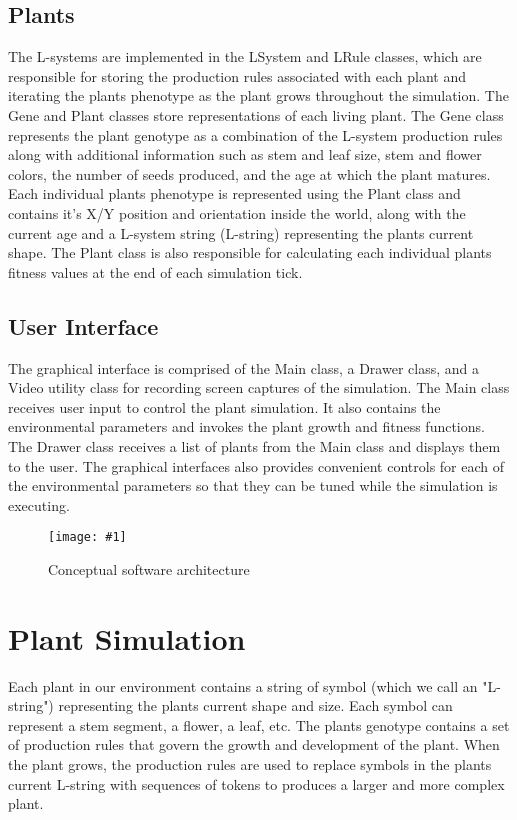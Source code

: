 \documentclass[conference]{acmsiggraph}
\newcommand{\onecol}[3]{
  \begin{figure}
    \centering
    \texttt{[image: \#1]}
    \vspace{0.0in}%
    \caption{#3}
    \label{#2}
  \end{figure}
}
\begin{document}
\subsection{Plants}

The L-systems are implemented in the LSystem and LRule classes, which are
responsible for storing the production rules associated with each plant and
iterating the plants phenotype as the plant grows throughout the simulation. The
Gene and Plant classes store representations of each living plant. The Gene
class represents the plant genotype as a combination of the L-system production
rules along with additional information such as stem and leaf size, stem and
flower colors, the number of seeds produced, and the age at which the plant
matures. Each individual plants phenotype is represented using the Plant class
and contains it's X/Y position and orientation inside the world, along with the
current age and a L-system string (L-string) representing the plants current
shape. The Plant class is also responsible for calculating each individual
plants fitness values at the end of each simulation tick.

\subsection{User Interface}

The graphical interface is comprised of the Main class, a Drawer class, and a
Video utility class for recording screen captures of the simulation. The Main
class receives user input to control the plant simulation. It also contains the
environmental parameters and invokes the plant growth and fitness functions. The
Drawer class receives a list of plants from the Main class and displays them to
the user. The graphical interfaces also provides convenient controls for each of
the environmental parameters so that they can be tuned while the simulation is
executing.

\onecol{images/architecture.png}{arch}{Conceptual software architecture}

\section{Plant Simulation}

Each plant in our environment contains a string of symbol (which we call an
"L-string") representing the plants current shape and size. Each symbol can
represent a stem segment, a flower, a leaf, etc. The plants genotype contains a
set of production rules that govern the growth and development of the plant.
When the plant grows, the production rules are used to replace symbols in the
plants current L-string with sequences of tokens to produces a larger and more
complex plant.
\end{document}
